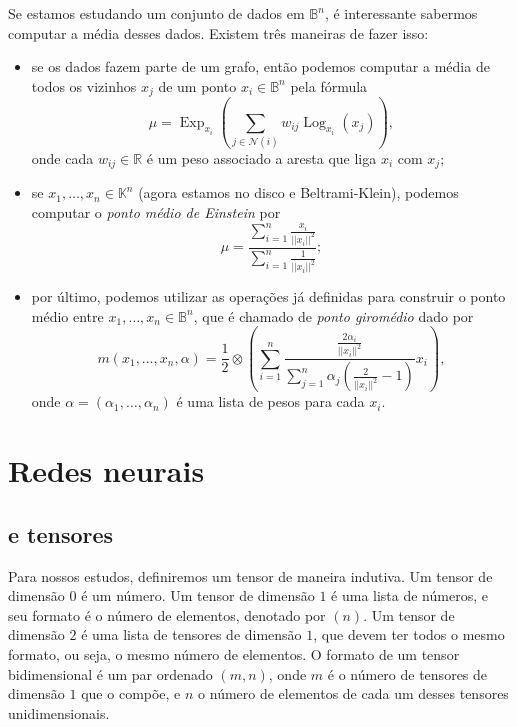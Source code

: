 \documentclass{article}
\DeclareMathOperator{\Exp}{Exp}
\DeclareMathOperator{\Log}{Log}
\begin{document}
Se estamos estudando um conjunto de dados em $\mathbb{B}^n$, é interessante sabermos computar a média desses dados. Existem três maneiras de fazer isso: \begin{itemize}
    \item se os dados fazem parte de um grafo, então podemos computar a média de todos os vizinhos $x_j$ de um ponto $x_i \in \mathbb{B}^n$ pela fórmula \begin{equation}
        \mu = \Exp_{x_i}\left(\sum_{j \in \mathcal{N}(i)} w_{ij} \Log_{x_i}(x_j)\right),
    \end{equation} onde cada $w_{ij} \in \mathbb{R}$ é um peso associado a aresta que liga $x_i$ com $x_j$;

    \item se $x_1, \dots, x_n \in \mathbb{K}^n$ (agora estamos no disco e Beltrami-Klein), podemos computar o \textit{ponto médio de Einstein} por \begin{equation}
        \mu = \frac{\sum_{i = 1}^n \frac{x_i}{||x_i||^2}}{\sum_{i = 1}^n \frac{1}{||x_i||^2}};
    \end{equation}

    \item por último, podemos utilizar as operações já definidas para construir o ponto médio entre $x_1, \dots, x_n \in \mathbb{B}^n$, que é chamado de \textit{ponto giromédio} dado por \begin{equation}
        m(x_1, \dots, x_n, \alpha) = \frac{1}{2} \otimes \left(\sum_{i = 1}^n \frac{\frac{2\alpha_i}{||x_i||^2}}{\sum_{j = 1}^n \alpha_j\left(\frac{2}{||x_i||^2} - 1\right)}x_i\right),
    \end{equation} onde $\alpha = (\alpha_1, \dots, \alpha_n)$ é uma lista de pesos para cada $x_i$.
\end{itemize}

\section{Redes neurais}

\subsection{\texorpdfstring{}{PyTorch} e tensores}

Para nossos estudos, definiremos um tensor de maneira indutiva. Um tensor de dimensão $0$ é um número. Um tensor de dimensão $1$ é uma lista de números, e seu formato é o número de elementos, denotado por $(n)$. Um tensor de dimensão $2$ é uma lista de tensores de dimensão $1$, que devem ter todos o mesmo formato, ou seja, o mesmo número de elementos. O formato de um tensor bidimensional é um par ordenado $(m,n)$, onde $m$ é o número de tensores de dimensão $1$ que o compõe, e $n$ o número de elementos de cada um desses tensores unidimensionais.
\end{document}
